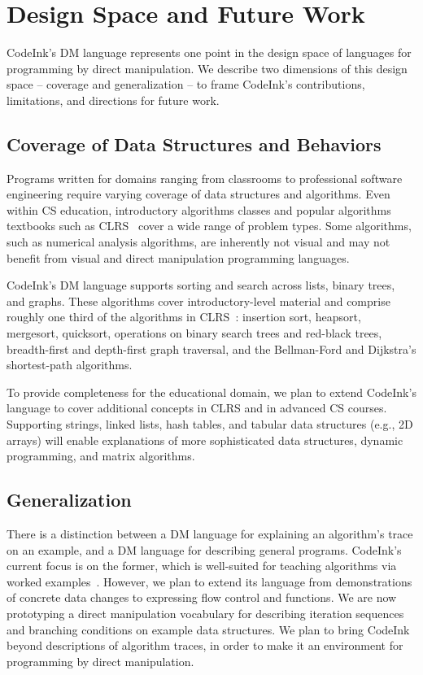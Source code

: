 \section{Design Space and Future Work}
\label{sec:design-and-future-work}

CodeInk's DM language represents one point in the design space of languages for
programming by direct manipulation. We describe two dimensions of this design
space -- coverage and generalization -- to frame CodeInk's contributions,
limitations, and directions for future work.

\subsection{Coverage of Data Structures and Behaviors}

Programs written for domains ranging from classrooms to professional
software engineering require varying coverage of data structures and
algorithms. Even within CS education, introductory
algorithms classes and popular algorithms textbooks such as
CLRS~\cite{Cormen2001} cover a wide range of problem types. Some algorithms,
such as numerical analysis algorithms, are inherently not visual and may
not benefit from visual and direct manipulation programming languages.

CodeInk's DM language supports sorting and search across lists, binary
trees, and graphs. These algorithms cover introductory-level material
and comprise roughly one third of the algorithms in
CLRS~\cite{Cormen2001}: insertion sort, heapsort, mergesort, quicksort,
operations on binary search trees and red-black trees, breadth-first and
depth-first graph traversal, and the Bellman-Ford and Dijkstra's
shortest-path algorithms.

To provide completeness for the educational domain, we plan to extend
CodeInk's language to cover additional concepts in CLRS and in advanced
CS courses. Supporting strings, linked lists, hash tables, and tabular
data structures (e.g., 2D arrays) will enable explanations of more
sophisticated data structures, dynamic programming, and matrix
algorithms.

\subsection{Generalization}
There is a distinction between a DM language for explaining an
algorithm's trace on an example, and a DM language for describing general programs.
CodeInk's current focus is on the former, which is well-suited for teaching
algorithms via worked examples~\cite{Sweller1985}. However, we plan to extend
its language from 
demonstrations of concrete data changes to expressing flow
control and functions.
We are now prototyping a direct manipulation vocabulary for describing iteration
sequences and branching conditions on example data structures. We plan to
bring CodeInk beyond descriptions of algorithm traces, in order to make it an
environment for programming by direct manipulation.

